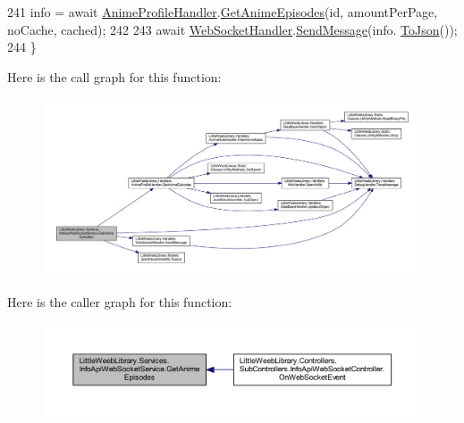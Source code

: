 \begin{DoxyCode}
241             info = await \mbox{\hyperlink{class_little_weeb_library_1_1_handlers_1_1_anime_profile_handler}{AnimeProfileHandler}}.\mbox{\hyperlink{class_little_weeb_library_1_1_handlers_1_1_anime_profile_handler_a5b163eb7e68b1e40904fa55454d8ba54}{GetAnimeEpisodes}}(\textcolor{keywordtype}{id}, 
      amountPerPage, noCache, cached);
242 
243             await \mbox{\hyperlink{class_little_weeb_library_1_1_handlers_1_1_web_socket_handler}{WebSocketHandler}}.\mbox{\hyperlink{class_little_weeb_library_1_1_handlers_1_1_web_socket_handler_a1de289d54d665a32c93478c68d3e6ad0}{SendMessage}}(info.
      \mbox{\hyperlink{class_little_weeb_library_1_1_models_1_1_json_kitsu_anime_info_a6f026c01a93f73b903cfef82d4c2dad5}{ToJson}}());
244         \}
\end{DoxyCode}
Here is the call graph for this function\+:\nopagebreak
\begin{figure}[H]
\begin{center}
\leavevmode
\includegraphics[width=350pt]{class_little_weeb_library_1_1_services_1_1_info_api_web_socket_service_a754f738fba586cc927d64251329c736a_cgraph}
\end{center}
\end{figure}
Here is the caller graph for this function\+:\nopagebreak
\begin{figure}[H]
\begin{center}
\leavevmode
\includegraphics[width=350pt]{class_little_weeb_library_1_1_services_1_1_info_api_web_socket_service_a754f738fba586cc927d64251329c736a_icgraph}
\end{center}
\end{figure}
\mbox{\label{class_little_weeb_library_1_1_services_1_1_info_api_web_socket_service_af6678c62bfe074bc5ce399ff21641d6e}} 
